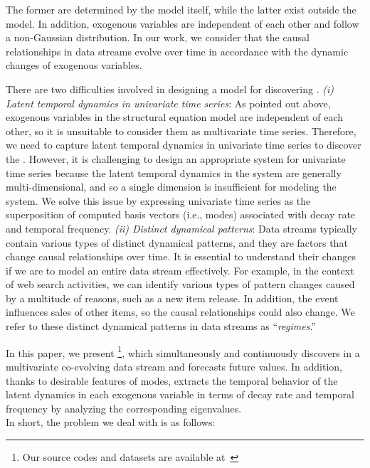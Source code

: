 The former are determined by the model itself,
while the latter exist outside the model.
In addition,
exogenous variables are independent of each other
and follow a non-Gaussian distribution.
In our work, we consider that the causal relationships in data streams evolve over time in accordance with the dynamic changes of exogenous variables.
\par
There are two difficulties involved in
designing a model for discovering \relation.
\textit{(i) Latent temporal dynamics in univariate time series}:
As pointed out above,
exogenous variables in the structural equation model
are independent of each other,
so it is unsuitable to consider
them as multivariate time series.
Therefore, we need to capture latent temporal dynamics in univariate time series
to discover the \relation.
However, it is challenging to design an appropriate system for univariate time series
because the latent temporal dynamics in the system are generally multi-dimensional,
and so a single dimension is insufficient for modeling the system.
We solve this issue by expressing univariate time series
as the superposition of computed basis vectors (i.e., modes) associated with
decay rate and temporal frequency.
\textit{(ii) Distinct dynamical patterns}:
Data streams typically contain various types of distinct dynamical patterns, and
they are factors that change causal relationships over time.
It is essential to understand their changes
if we are to model an entire data stream effectively.
For example,
in the context of web search activities,
we can identify various types of pattern changes
caused by a multitude of reasons, such as a new item release.
In addition, the event influences sales of other items, so the causal relationships could also change.
We refer to these distinct dynamical patterns in data streams as ``\textit{regimes}.''
\par
\TSK{

}
In this paper, we present \method\footnote{Our source codes and datasets are available at~\cite{code}},
which
simultaneously and continuously
discovers \relation in a multivariate co-evolving data stream
and forecasts future values.
In addition, 
thanks to desirable features of modes,
\method extracts
the temporal behavior of the latent dynamics in each exogenous variable in terms of decay rate and temporal frequency by analyzing the corresponding eigenvalues.
\\ In short, the problem we deal with is as follows:
